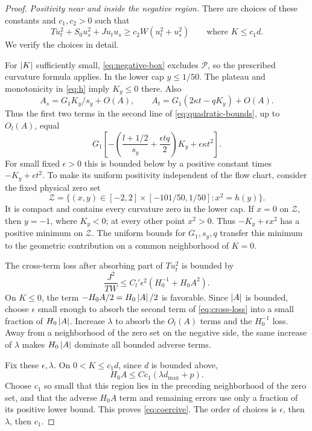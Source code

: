 \begin{proof}
\smallskip
\noindent\emph{Positivity near and inside the negative region.}
There are choices of these constants and \(c_1,c_2>0\) such that
\begin{equation}\label{eq:coercive}
T u_t^2+S_0u_s^2+Ju_tu_s
\ge c_2W(u_t^2+u_s^2)
\qquad\text{where }K\le c_1d.
\end{equation}
We verify the choices in detail.

For \(\left\lvert K\right\rvert\) sufficiently small, \eqref{eq:negative-box}
excludes \(\mathcal P\), so the prescribed curvature formula applies.
In the lower cap \(y\le1/50\). The plateau and monotonicity in
\eqref{eq:h} imply \(K_y\le0\) there. Also
\begin{equation}\label{eq:A-derivatives}
A_s=G_1K_y/s_y+O(A),\qquad
A_t=G_1(2\kappa t-qK_y)+O(A).
\end{equation}
Thus the first two terms in the second line of
\eqref{eq:quadratic-bounds}, up to \(O_l(A)\), equal
\[
G_1\left[
-\left(\frac{l+1/2}{s_y}+\frac{\epsilon tq}{2}\right)K_y
+\epsilon\kappa t^2
\right].
\]
For small fixed \(\epsilon>0\) this is bounded below by a positive
constant times \(-K_y+\epsilon t^2\). To make its uniform
positivity independent of the flow chart, consider the fixed
physical zero set
\[
\mathcal Z=\{(x,y)\in[-2,2]\times[-101/50,1/50]:x^2=h(y)\}.
\]
It is compact and contains every curvature zero in the lower cap.
If \(x=0\) on \(\mathcal Z\), then \(y=-1\), where \(K_y<0\);
at every other point \(x^2>0\). Thus
\(-K_y+\epsilon x^2\) has a positive minimum on \(\mathcal Z\).
The uniform bounds for \(G_1,s_y,q\) transfer this minimum to
the geometric contribution on a common neighborhood of \(K=0\).

The cross-term loss after absorbing part of \(T u_t^2\) is bounded by
\begin{equation}\label{eq:cross-loss}
\frac{J^2}{TW}
\le C_l'\epsilon^2\left(H_0^{-1}+H_0A^2\right).
\end{equation}
On \(K\le0\), the term \(-H_0A/2=H_0\left\lvert A\right\rvert/2\) is favorable.
Since \(\left\lvert A\right\rvert\) is bounded, choose \(\epsilon\) small enough
to absorb the second term of \eqref{eq:cross-loss} into a small
fraction of \(H_0\left\lvert A\right\rvert\). Increase \(\lambda\) to absorb
the \(O_l(A)\) terms and the \(H_0^{-1}\) loss.
Away from a neighborhood of the zero set on the negative side,
the same increase of \(\lambda\) makes \(H_0\left\lvert A\right\rvert\) dominate
all bounded adverse terms.

Fix these \(\epsilon,\lambda\). On \(0<K\le c_1d\), since \(d\)
is bounded above,
\[
H_0A\le Cc_1(\lambda d_{\max}+p).
\]
Choose \(c_1\) so small that this region lies in the preceding
neighborhood of the zero set, and that the adverse \(H_0A\)
term and remaining errors use only a fraction of its positive
lower bound. This proves \eqref{eq:coercive}. The order of
choices is \(\epsilon\), then \(\lambda\), then \(c_1\).


\end{proof}
